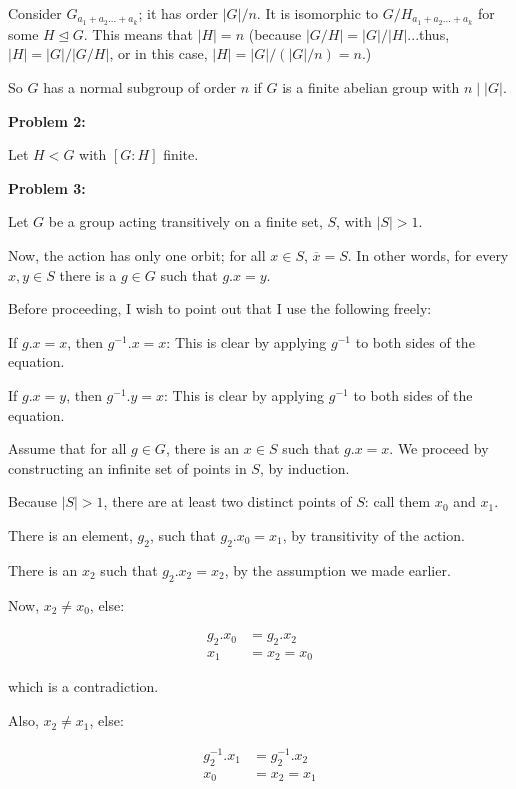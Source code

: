 \documentclass[a4paper,12pt]{article}
\newcommand{\tab}{\hspace{4mm}} %
\newcommand{\shunt}{\vspace{20mm}}
\newcommand{\absval}[1]{\lvert #1 \rvert}
\newcommand{\subgp}{\mathrel{\unlhd}}
\begin{document}
Consider $G_{a_1+a_2 \ldots +a_k}$; it has order $\absval{G}/n$. It is isomorphic to $G/H_{a_1+a_2 \ldots +a_k}$ for some $H \subgp G$. This means that $\absval{H} = n$ (because $\absval{G/H} = \absval{G}/\absval{H}$...thus, $\absval{H} = \absval{G}/\absval{G/H}$, or in this case, $\absval{H} = \absval{G}/(\absval{G}/n) = n$.)

So $G$ has a normal subgroup of order $n$ if $G$ is a finite abelian group with $n \mid \absval{G}$.

\shunt

{\bf Problem 2:}

Let $H < G$ with $[G:H]$ finite.

\shunt

{\bf Problem 3:}

Let $G$ be a group acting transitively on a finite set, $S$, with $\absval{S} > 1$.

Now, the action has only one orbit; for all $x \in S$, $\overline{x} = S$. In other words, for every $x, y \in S$ there is a $g \in G$ such that $g.x = y$.

Before proceeding, I wish to point out that I use the following freely:

\tab If $g.x = x$, then $g^{-1}.x=x$: This is clear by applying $g^{-1}$ to both sides of the equation.

\tab If $g.x=y$, then $g^{-1}.y=x$: This is clear by applying $g^{-1}$ to both sides of the equation.

Assume that for all $g \in G$, there is an $x \in S$ such that $g.x=x$. We proceed by constructing an infinite set of points in $S$, by induction.

\tab Because $\absval{S} >1$, there are at least two distinct points of $S$: call them $x_0$ and $x_1$.

\tab There is an element, $g_2$, such that $g_2.x_0=x_1$, by transitivity of the action.

\tab There is an $x_2$ such that $g_2.x_2 = x_2$, by the assumption we made earlier.

\tab Now, $x_2 \neq x_0$, else:

\begin{align*}
g_2.x_0 &= g_2.x_2\\
x_1&= x_2=x_0
\end{align*}

\tab which is a contradiction.

\tab Also, $x_2 \neq x_1$, else:

\begin{align*}
g_2^{-1}.x_1 &= g_2^{-1}.x_2\\
x_0&= x_2=x_1
\end{align*} 
\end{document}

